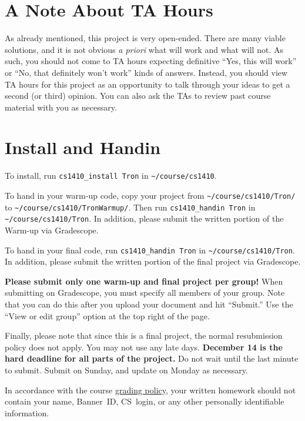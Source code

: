\documentclass{article}
\begin{document}
\section{A Note About TA Hours}
As already mentioned, this project is very open-ended.  There are many
viable solutions, and it is not obvious \emph{a priori\/} what will
work and what will not.  As such, you should not come to TA hours
expecting definitive ``Yes, this will work'' or ``No, that definitely
won't work'' kinds of answers.  Instead, you should view TA hours for
this project as an opportunity to talk through your ideas to get a
second (or third) opinion.  You can also ask the TAs to review past
course material with you as necessary.


\section{Install and Handin}
To install, run \verb|cs1410_install Tron| in \verb|~/course/cs1410|.

To hand in your warm-up code,
copy your project from \verb|~/course/cs1410/Tron/|
to \verb|~/course/cs1410/TronWarmup/|.
Then run \verb|cs1410_handin Tron| in \verb|~/course/cs1410/Tron|.
In addition, please submit the written portion of the Warm-up via Gradescope.

To hand in your final code, run \verb|cs1410_handin Tron| in \verb|~/course/cs1410/Tron|.
In addition, please submit the written portion of the final project via Gradescope.


\textbf{Please submit only one warm-up and final project per group!}
When submitting on Gradescope, you must specify all members of your
group.  Note that you can do this after you upload your document and
hit ``Submit.''  Use the ``View or edit group'' option at the top
right of the page.

Finally, please note that since this is a final project,
the normal resubmission policy does not apply.
You may not use any late days.
\textbf{December 14 is the hard deadline for all parts of the project.}
Do not wait until the last minute to submit.
Submit on Sunday, and update on Monday as necessary.

In accordance with the course \href{https://forms.gle/DqfbBY8jdaqenRoa9}{grading policy}, your
written homework should not contain your name, Banner~ID, CS~login, or any other personally
identifiable information.


\nocite{lanctot13}
\nocite{teuling12}
\nocite{samothrakis10}
\end{document}
